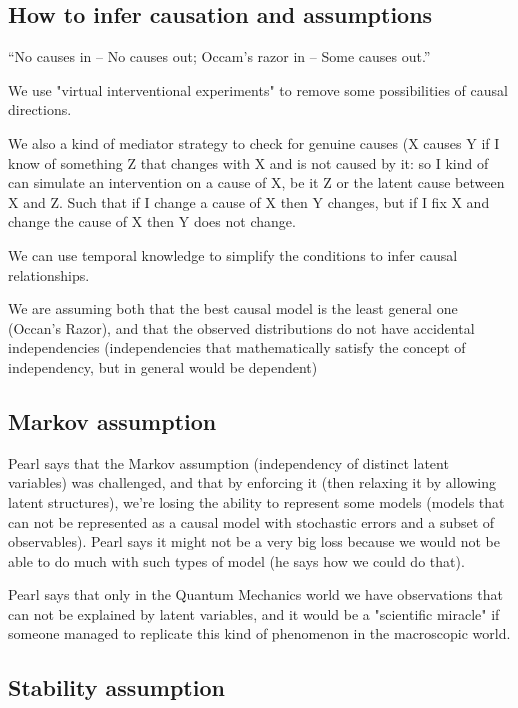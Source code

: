 \subsection{How to infer causation and assumptions}

“No causes in – No causes out; Occam’s razor in – Some causes out.”

We use "virtual interventional experiments" to remove some possibilities of causal directions.

We also a kind of mediator strategy to check for genuine causes (X causes Y if I know of something Z that changes with X and is not caused by it: so I kind of can simulate an intervention on a cause of X, be it Z or the latent cause between X and Z. Such that if I change a cause of X then Y changes, but if I fix X and change the cause of X then Y does not change.

We can use temporal knowledge to simplify the conditions to infer causal relationships.

We are assuming both that the best causal model is the least general one (Occan's Razor), and that the observed distributions do not have accidental independencies (independencies that mathematically satisfy the concept of independency, but in general would be dependent)

\subsection{Markov assumption}

Pearl says that the Markov assumption (independency of distinct latent variables) was challenged, and that by enforcing it (then relaxing it by allowing latent structures), we're losing the ability to represent some models (models that can not be represented as a causal model with stochastic errors and a subset of observables). Pearl says it might not be a very big loss because we would not be able to do much with such types of model (he says  how we could do that).

Pearl says that only in the Quantum Mechanics world we have observations that can not be explained by latent variables, and it would be a "scientific miracle" if someone managed to replicate this kind of phenomenon in the macroscopic world.

\subsection{Stability assumption}

